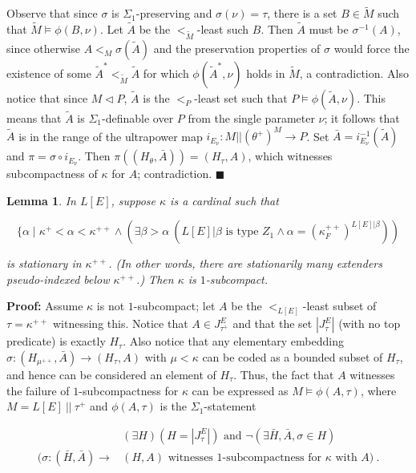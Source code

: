 \documentclass[12pt]{article}
\newtheorem{lem}[thm]{Lemma}
\begin{document}
Observe that since $\sigma$ is $\Sigma_1$-preserving and $\sigma (\nu) = \tau$, there is a set $B \in \tilde{M}$ such that $\tilde{M} \models \phi (B , \nu )$.  Let $\tilde{A}$ be the $<_{\tilde{M}}$-least such $B$.  Then $\tilde{A}$ must be $\sigma^{-1} (A)$, since otherwise $A <_M \sigma (\tilde{A} )$ and the preservation properties of $\sigma$ would force the existence of some $\tilde{A}^*  <_{\tilde{M}} \tilde{A}$ for which $\phi ( \tilde{A}^* , \nu )$ holds in $\tilde{M}$, a contradiction.  Also notice that since $M \lhd P$, $\tilde{A}$ is the $<_P$-least set such that $P \models \phi(\tilde{A} , \nu )$.  This means that $\tilde{A}$ is $\Sigma_1$-definable over $P$ from the single parameter $\nu$; it follows that $\tilde{A}$ is in the range of the ultrapower map $i_{E_\nu } : M || (\theta^+ )^M \longrightarrow P$.  Set $\bar{A} = i_{E_\nu }^{-1} (\tilde{A} )$ and $\pi = \sigma \circ i_{E_\nu}$.  Then $\pi (( H_\theta , \bar{A} )) = (H_\tau , A )$, which witnesses subcompactness of $\kappa$ for $A$; contradiction. $\blacksquare$\\



\begin{lem} In $L[E]$, suppose $\kappa$ is a cardinal such that 

\[
\{ \alpha \mid \kappa^+ < \alpha < \kappa^{++} \wedge ( \exists \beta > \alpha \ ( L[E] | \beta \text{ is type } Z_1 \wedge \alpha = (\kappa_F^{++})^{L[E] | \beta}))
\]

is stationary in $\kappa^{++}$.  (In other words, there are stationarily many extenders \textit{pseudo-indexed} below $\kappa^{++}$.)  Then $\kappa$ is $1$-subcompact.
\end{lem}

\textbf{Proof:}  Assume $\kappa$ is not $1$-subcompact; let $A$ be the $<_{L[E]}$-least subset of $\tau = \kappa^{++}$ witnessing this.  Notice that $A \in J^E_{\tau^+}$ and that the set $| J^E_\tau | $ (with no top predicate) is exactly $H_\tau$.  Also notice that any elementary embedding $\sigma : ( H_{\mu^{++}} , \bar{A} ) \longrightarrow (H_\tau , A )$ with $\mu < \kappa$ can be coded as a bounded subset of $H_\tau$, and hence can be considered an element of $H_\tau$.  Thus, the fact that $A$ witnesses the failure of $1$-subcompactness for $\kappa$ can be expressed as $M \models \phi (A , \tau )$, where $M = L[E] \ || \ \tau^+ $ and $\phi (A , \tau )$ is the $\Sigma_1$-statement 

\[
\begin{split}
& ( \exists H) (H = | J^E_\tau | ) \text{ and } \neg ( \exists \bar{H} , \bar{A} , \sigma \in H ) \\ 
( \sigma : ( \bar{H} , \bar{A} ) \longrightarrow & ( H , A ) \text{ witnesses $1$-subcompactness for } \kappa \text{ with } A ) \ .
\end{split}
\]
\end{document}
